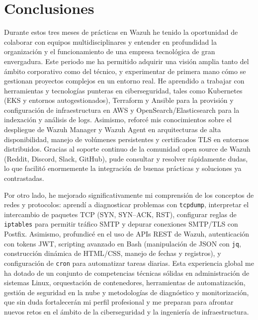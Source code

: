 \chapter{Conclusiones}
Durante estos tres meses de prácticas en Wazuh he tenido la oportunidad de colaborar con equipos multidisciplinares y entender en profundidad la organización y el funcionamiento de una empresa tecnológica de gran envergadura. Este periodo me ha permitido adquirir una visión amplia tanto del ámbito corporativo como del técnico, y experimentar de primera mano cómo se gestionan proyectos complejos en un entorno real. He aprendido a trabajar con herramientas y tecnologías punteras en ciberseguridad, tales como Kubernetes (EKS y entornos autogestionados), Terraform y Ansible para la provisión y configuración de infraestructura en AWS y OpenSearch/Elasticsearch para la indexación y análisis de logs. Asimismo, reforcé mis conocimientos sobre el despliegue de Wazuh Manager y Wazuh Agent en arquitecturas de alta disponibilidad, manejo de volúmenes persistentes y certificados TLS en entornos distribuidos. Gracias al soporte continuo de la comunidad open source de Wazuh (Reddit, Discord, Slack, GitHub), pude consultar y resolver rápidamente dudas, lo que facilitó enormemente la integración de buenas prácticas y soluciones ya contrastadas.

Por otro lado, he mejorado significativamente mi comprensión de los conceptos de redes y protocolos: aprendí a diagnosticar problemas con \texttt{tcpdump}, interpretar el intercambio de paquetes TCP (SYN, SYN–ACK, RST), configurar reglas de \texttt{iptables} para permitir tráfico SMTP y depurar conexiones SMTP/TLS con Postfix. Asimismo, profundicé en el uso de APIs REST de Wazuh, autenticación con tokens JWT, scripting avanzado en Bash (manipulación de JSON con \texttt{jq}, construcción dinámica de HTML/CSS, manejo de fechas y registros), y configuración de \texttt{cron} para automatizar tareas diarias. Esta experiencia global me ha dotado de un conjunto de competencias técnicas sólidas en administración de sistemas Linux, orquestación de contenedores, herramientas de automatización, gestión de seguridad en la nube y metodologías de diagnóstico y monitorización, que sin duda fortalecerán mi perfil profesional y me preparan para afrontar nuevos retos en el ámbito de la ciberseguridad y la ingeniería de infraestructura.